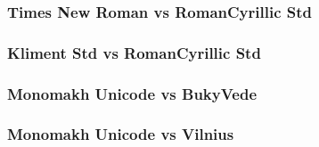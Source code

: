 \documentclass[12pt]{article}
\begin{document}
\subsubsection{Times New Roman vs RomanCyrillic Std}


\subsubsection{Kliment Std vs RomanCyrillic Std}

 
\subsubsection{Monomakh Unicode vs BukyVede}

 
\subsubsection{Monomakh Unicode vs Vilnius}

 
\end{document}
